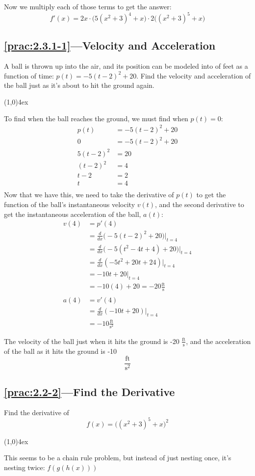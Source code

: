 \documentclass{MathNotes}
\newcommand{\br}{
\begin{center}
\line(1,0){4ex}
\end{center}}
\begin{document}
Now we multiply each of those terms to get the answer:
$$f'(x)=2x\cdot\big(5(x^2+3)^4+x\big)\cdot2\big((x^2+3)^5+x\big)$$

\subsection*{\ref{prac:2.3.1-1}---Velocity and Acceleration}\label{ans:2.3.1-1}
A ball is thrown up into the air, and its position can be modeled into
of feet as a function of time: $p(t)=-5(t-2)^2+20$. Find the velocity and
acceleration of the ball just as it's about to hit the ground again.
\br
To find when the ball reaches the ground, we must find when $p(t)=0$:
\begin{align*}
    p(t)&=-5(t-2)^2+20\\
       0&=-5(t-2)^2+20\\
    5(t-2)^2&=20\\
    (t-2)^2&=4\\
    t-2&=2\\
    t&=4\\
\end{align*}
Now that we have this, we need to take the derivative of $p(t)$ to get the
function of the ball's instantaneous velocity $v(t)$, and the second derivative
to get the instantaneous acceleration of the ball, $a(t)$:
\begin{align*}
    v(4)&=p'(4)\\
    &=\frac{d}{dx}\big(-5(t-2)^2+20\big)\Big|_{t=4}\\
    &=\frac{d}{dx}\big(-5(t^2-4t+4)+20\big)\Big|_{t=4}\\
    &=\frac{d}{dx}(-5t^2+20t+24)\Big|_{t=4}\\
    &=-10t+20\Big|_{t=4}\\
    &=-10(4)+20=-20\frac{\text{ft}}{\text{s}}\\
    \\
    a(4)&=v'(4)\\
    &=\frac{d}{dx}(-10t+20)\Big|_{t=4}\\
    &=-10\frac{\text{ft}}{\text{s}^2}
\end{align*}

The velocity of the ball just when it hits the ground is -20 
$\displaystyle\frac{\text{ft}}{\text{s}}$, and the acceleration of the ball as 
it hits the ground is -10 $$\frac{\text{ft}}{\text{s}^2}$$

\subsection*{\ref{prac:2.2-2}---Find the Derivative}\label{ans:2.2-2}
Find the derivative of $$f(x)=\big((x^2+3)^5+x\big)^2$$
\br
This seems to be a chain rule problem, but instead of just nesting once,
it's nesting twice: $f(g(h(x)))$
\end{document}
